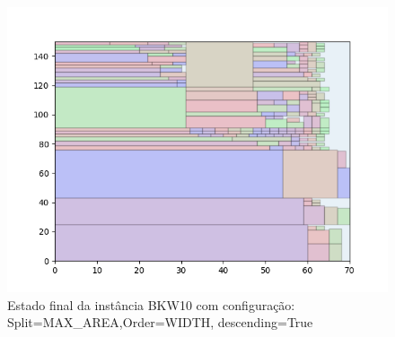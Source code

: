 \begin{figure}[H]
    \centering
    \caption[]{Estado final da instância BKW10 com configuração: Split=MAX_AREA,Order=WIDTH, descending=True}
    \label{fig:bkw10-max_area-width-true}
    \includegraphics[scale=0.5]{output/figures/bkw/bkw10/max_area/width/true/000}
\end{figure}
